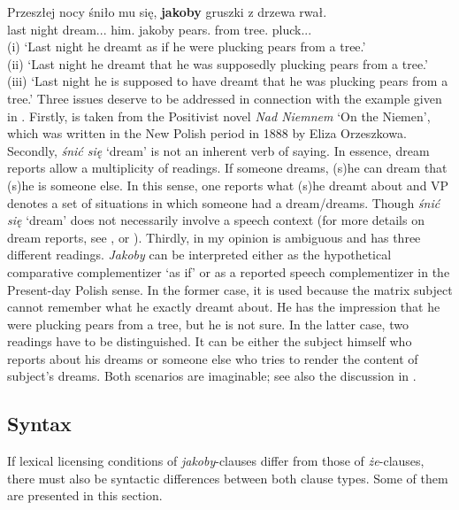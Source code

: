 \documentclass[output=paper]{langsci/langscibook}
\begin{document}
\ea \gll Przeszłej nocy śniło mu się, \textbf{jakoby} gruszki z drzewa rwał. \label{gruszki} \\
		last night dream.{\lptcp}.{\sg}.{\n} him.{\dat} {} jakoby pears.{\acc} from tree.{\gen} pluck.{\lptcp}.{\sg}.{\fem} \\
	\glt	(i) `Last night he dreamt as if he were plucking pears from a tree.' \\
	\glt	(ii) `Last night he dreamt that he was supposedly plucking pears from a tree.' \\
	\glt	(iii) `Last night he is supposed to have dreamt that he was plucking pears from a tree.'
\z
Three issues deserve to be addressed in connection with the example given in . Firstly,  is taken from the Positivist novel \emph{Nad Niemnem} `On the Niemen', which was written in the New Polish period in 1888 by Eliza Orzeszkowa. Secondly, \emph{śnić się} `dream' is not an inherent verb of saying. In essence, dream reports allow a multiplicity of readings. If someone dreams, (s)he can dream that (s)he is someone else. In this sense, one reports what (s)he dreamt about and VP denotes a set of situations in which someone had a dream\slash dreams. Though  \emph{śnić się} `dream' does not necessarily involve a speech context (for more details on dream reports, see \citealt{Shanon1980}, \citealt{Percus-Sauerland2003} or \citealt{Kauf2017}). Thirdly, in my opinion  is ambiguous and has three different readings. \emph{Jakoby} can be interpreted either as the hypothetical comparative complementizer `as if' or as a reported speech complementizer in the Present-day Polish sense. In the former case, it is used because the matrix subject cannot remember what he exactly dreamt about. He has the impression that he were plucking pears from a tree, but he is not sure. In the latter case, two readings have to be distinguished. It can be either the subject himself who reports about his dreams or someone else who tries to render the content of subject's dreams. Both scenarios are imaginable; see also the discussion in .

\subsection{Syntax}

If lexical licensing conditions of \emph{jakoby}-clauses differ from those of \emph{że}-clauses, there must also be syntactic differences between both clause types. Some of them are presented in this section.
\end{document}

